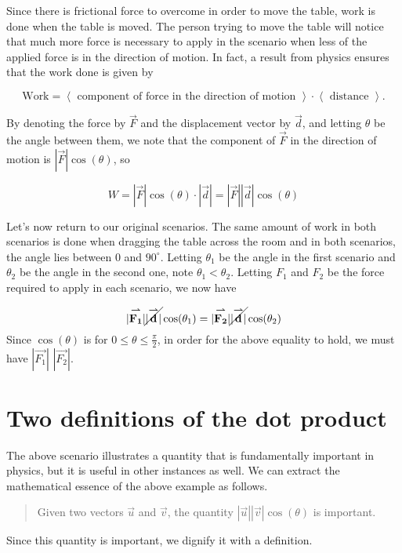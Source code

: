 \documentclass{ximera}
\begin{document}
\begin{model}
Since there is frictional force to overcome in order to move the table, work is done when the table is moved.  The person trying to move the table will notice that much more force is necessary to apply in the scenario when less of the applied force is in the direction of motion.  In fact, a result from physics ensures that the work done is given by

\[
\textrm{Work} = \left<\textrm{ component of force in the direction of motion }\right> \cdot \left<\textrm{ distance }\right>.
\]

By denoting the force by $\vec{F}$ and the displacement vector by $\vec{d}$, and letting $\theta$ be the angle between them, we note that the component of $\vec{F}$ in the direction of motion is $|\vec{F}|\cos(\theta)$, so 

\[
W = |\vec{F}| \cos(\theta) \cdot |\vec{d}| = |\vec{F}||\vec{d}|\cos(\theta)
\]

Let's now return to our original scenarios.  The same amount of work in both scenarios is done when dragging the table across the room and in both scenarios, the angle lies between $0$ and $90^{\circ}$.  Letting $\theta_1$ be the angle in the first scenario and $\theta_2$ be the angle in the second one, note $\theta_1 <\theta_2$.  Letting $F_1$ and $F_2$ be the force required to apply in each scenario, we now have 

\[
|\vec{F_1}|\cancel{|\vec{d}|}\cos(\theta_1) = |\vec{F_2}|\cancel{|\vec{d}|}\cos(\theta_2)
\]
Since $\cos(\theta)$ is  for $0\leq \theta\leq \frac{\pi}{2}$, in order for the above equality to hold,  we must have $|\vec{F_1}|$ \wordChoice{\choice[correct]{$<$}\choice{$=$}\choice{$>$}} $|\vec{F_2}|$.
\end{model}

\section{Two definitions of the dot product}
The above scenario illustrates a quantity that is fundamentally important in physics, but it is useful in other instances as well.  We can extract the mathematical essence of the above example as follows.  

\begin{quote}
Given two vectors $\vec{u}$ and $\vec{v}$, the quantity $|\vec{u}||\vec{v}|\cos(\theta)$ is important.
\end{quote}

Since this quantity is important, we dignify it with a definition.
\end{document}
